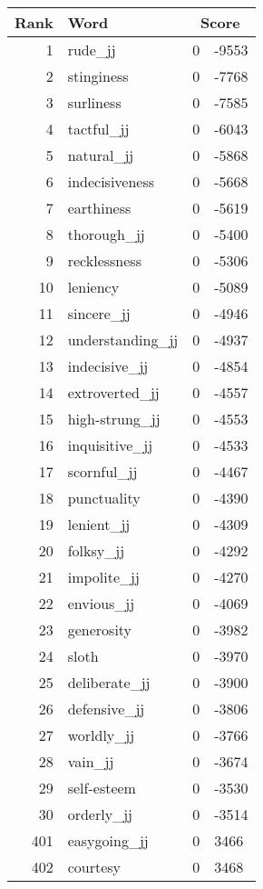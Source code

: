 \begin{longtable}[!htbp]{| rlr@{.}l |}
    \hline
    \textbf{Rank} & \textbf{Word} & \multicolumn{2}{c|}{\textbf{Score}} \\
    \hline
    \endhead
    1 & rude\_jj & 0 & -9553 \\
    2 & stinginess & 0 & -7768 \\
    3 & surliness & 0 & -7585 \\
    4 & tactful\_jj & 0 & -6043 \\
    5 & natural\_jj & 0 & -5868 \\
    6 & indecisiveness & 0 & -5668 \\
    7 & earthiness & 0 & -5619 \\
    8 & thorough\_jj & 0 & -5400 \\
    9 & recklessness & 0 & -5306 \\
    10 & leniency & 0 & -5089 \\
    11 & sincere\_jj & 0 & -4946 \\
    12 & understanding\_jj & 0 & -4937 \\
    13 & indecisive\_jj & 0 & -4854 \\
    14 & extroverted\_jj & 0 & -4557 \\
    15 & high-strung\_jj & 0 & -4553 \\
    16 & inquisitive\_jj & 0 & -4533 \\
    17 & scornful\_jj & 0 & -4467 \\
    18 & punctuality & 0 & -4390 \\
    19 & lenient\_jj & 0 & -4309 \\
    20 & folksy\_jj & 0 & -4292 \\
    21 & impolite\_jj & 0 & -4270 \\
    22 & envious\_jj & 0 & -4069 \\
    23 & generosity & 0 & -3982 \\
    24 & sloth & 0 & -3970 \\
    25 & deliberate\_jj & 0 & -3900 \\
    26 & defensive\_jj & 0 & -3806 \\
    27 & worldly\_jj & 0 & -3766 \\
    28 & vain\_jj & 0 & -3674 \\
    29 & self-esteem & 0 & -3530 \\
    30 & orderly\_jj & 0 & -3514 \\
    401 & easygoing\_jj & 0 & 3466 \\
    402 & courtesy & 0 & 3468 \\

\end{longtable}
